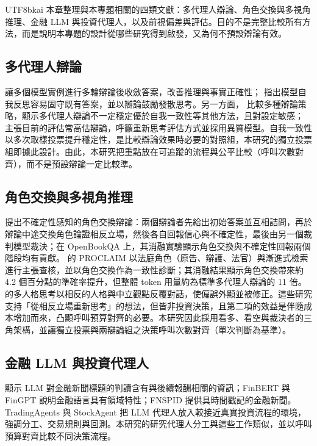 \documentclass[12pt,a4paper]{article}
\begin{document}
\begin{CJK}{UTF8}{bkai}
本章整理與本專題相關的四類文獻：多代理人辯論、角色交換與多視角推理、金融 LLM 與投資代理人，以及前視偏差與評估。目的不是完整比較所有方法，而是說明本專題的設計從哪些研究得到啟發，又為何不預設辯論有效。

\subsection{多代理人辯論}

\citet{du2023debate} 讓多個模型實例進行多輪辯論後收斂答案，改善推理與事實正確性；\citet{liang2023divergent} 指出模型自我反思容易固守既有答案，並以辯論鼓勵發散思考。另一方面，\citet{smit2023mad} 比較多種辯論策略，顯示多代理人辯論不一定穩定優於自我一致性等其他方法，且對設定敏感；\citet{zhang2025stop} 主張目前的評估常高估辯論，呼籲重新思考評估方式並採用異質模型。自我一致性 \citep{wang2023selfconsistency} 以多次取樣投票提升穩定性，是比較辯論效果時必要的對照組，本研究的獨立投票組即據此設計。由此，本研究把重點放在可追蹤的流程與公平比較（呼叫次數對齊），而不是預設辯論一定比較準。

\subsection{角色交換與多視角推理}

\citet{liu2025roleswitch} 提出不確定性感知的角色交換辯論：兩個辯論者先給出初始答案並互相詰問，再於辯論中途交換角色論證相反立場，然後各自回報信心與不確定性，最後由另一個裁判模型裁決；在 OpenBookQA 上，其消融實驗顯示角色交換與不確定性回報兩個階段均有貢獻。\citet{chowdhury2026proclaim} 的 PROCLAIM 以法庭角色（原告、辯護、法官）與漸進式檢索進行主張查核，並以角色交換作為一致性診斷；其消融結果顯示角色交換帶來約 4.2 個百分點的準確率提升，但整體 token 用量約為標準多代理人辯論的 11 倍。\citet{chen2026mpt} 的多人格思考以相反的人格與中立觀點反覆對話，使偏誤外顯並被修正。這些研究支持「從相反立場重新思考」的想法，但皆非投資決策，且第二項的效益是伴隨成本增加而來，凸顯呼叫預算對齊的必要。本研究因此採用看多、看空與裁決者的三角架構，並讓獨立投票與兩辯論組之決策呼叫次數對齊（單次判斷為基準）。

\subsection{金融 LLM 與投資代理人}

\citet{lopezlira2023chatgpt} 顯示 LLM 對金融新聞標題的判讀含有與後續報酬相關的資訊；FinBERT \citep{araci2019finbert} 與 FinGPT \citep{liu2023fingpt} 說明金融語言具有領域特性；FNSPID \citep{dong2024fnspid} 提供具時間戳記的金融新聞。TradingAgents \citep{xiao2024tradingagents} 與 StockAgent \citep{zhang2024stockagent} 把 LLM 代理人放入較接近真實投資流程的環境，強調分工、交易規則與回測。本研究的研究代理人分工與這些工作類似，並以呼叫預算對齊比較不同決策流程。


\end{CJK}
\end{document}
